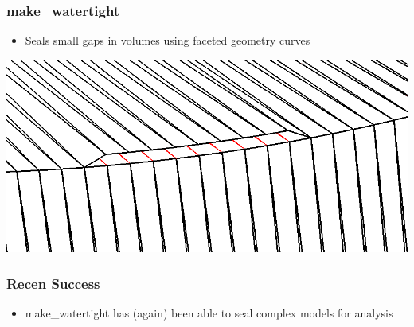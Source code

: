 \documentclass[14pt]{beamer}
\begin{document}
\begin{frame}
\frametitle{make\_watertight}
\begin{itemize}
\item Seals small gaps in volumes using faceted geometry curves
\end{itemize}
\begin{center}
\includegraphics[scale=0.25, trim = 0 200 0 0 ]{cyl_loop_close.png}
\end{center}

\end{frame}


\begin{frame}
\frametitle{Recen Success}
\begin{itemize}
\item make\_watertight has (again) been able to seal complex models for analysis
\end{itemize}
\end{frame}
\end{document}

